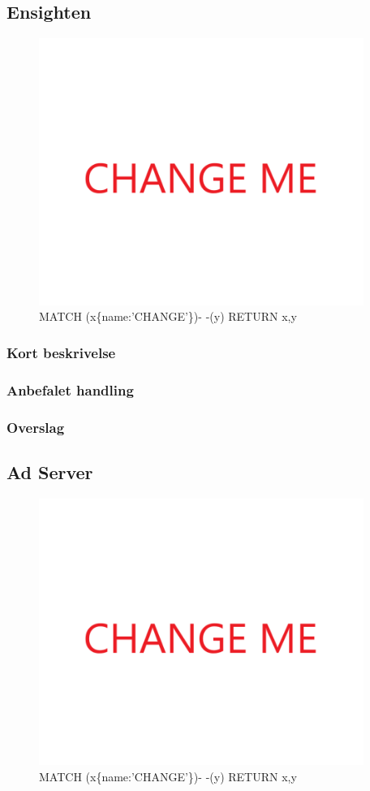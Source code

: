 \documentclass{article}
\begin{document}
\subsection{Ensighten}
\begin{figure}[h]
\includegraphics[width=300pt]{CHANGE.PNG}
\caption{MATCH (x\{name:'CHANGE'\})- -(y) RETURN x,y}
\end{figure}
\subsubsection{Kort beskrivelse}
\subsubsection{Anbefalet handling}
\subsubsection{Overslag}
\subsection{Ad Server}
\begin{figure}[h]
\includegraphics[width=300pt]{CHANGE.PNG}
\caption{MATCH (x\{name:'CHANGE'\})- -(y) RETURN x,y}
\end{figure}
\end{document}
